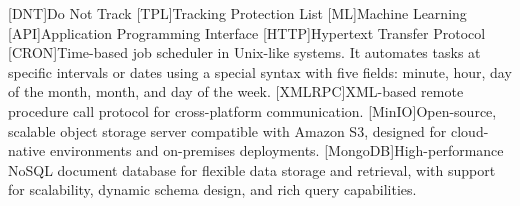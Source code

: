 \usepackage{glossaries}

\makeglossaries

[DNT]{Do Not Track} 
[TPL]{Tracking Protection List}
[ML]{Machine Learning}
[API]{Application Programming Interface}
[HTTP]{Hypertext Transfer Protocol}
[CRON]{Time-based job scheduler in Unix-like systems. It automates tasks at specific intervals or dates using a special syntax with five fields: minute, hour, day of the month, month, and day of the week.}
[XMLRPC]{XML-based remote procedure call protocol for cross-platform communication.}
[MinIO]{Open-source, scalable object storage server compatible with Amazon S3, designed for cloud-native environments and on-premises deployments.}
[MongoDB]{High-performance NoSQL document database for flexible data storage and retrieval, with support for scalability, dynamic schema design, and rich query capabilities.}

\glsaddall
